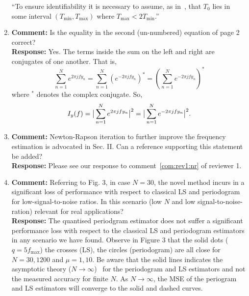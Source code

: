\documentclass[a4paper,10pt]{article}
\begin{document}
\begin{enumerate}
``To ensure identifiability it is necessary to assume, as in~\cite{Sidiropoulos2005}, that $T_0$ lies in some interval $(T_{\text{min}}, T_{\text{max}})$ where $T_{\text{max}} < 2T_{\text{min}}$.''

\item\textbf{Comment:}
Is the equality in the second (un-numbered) equation of page 2 correct?
\\
\textbf{Response:}
Yes.  The terms inside the sum on the left and right are conjugates of one another.  That is,
\[
\sum_{n=1}^N e^{ 2\pi j f y_n} = \sum_{n=1}^N (e^{-2\pi j f y_n})^* = \left( \sum_{n=1}^N e^{ -2\pi j f y_n} \right)^*
\]
where $^*$ denotes the complex conjugate.  So,
\[
I_y(f) = \big\vert  \sum_{n=1}^N e^{ 2\pi j f y_n}  \big\vert^2 = \big\vert  \sum_{n=1}^N e^{ -2\pi j f y_n}  \big\vert^2.
\]

\item\textbf{Comment:}
Newton-Rapson iteration to further improve the frequency estimation is advocated in Sec. II. Can a reference supporting this statement be added?
\\
\textbf{Response:}
Please see our response to comment~\ref{com:rev1:nr} of reviewer 1.

\item\textbf{Comment:}
Referring to Fig. 3, in case $N=30$, the novel method incurs in a significant loss of performance with respect to classical LS and periodogram for low-signal-to-noise ratios. In this scenario (low $N$ and low signal-to-noise-ration) relevant for real applications?
\\
\textbf{Response:}
The quantised periodgram estimator does not suffer a significant performance loss with respect to the classical LS and periodogram estimators in any scenario we have found.  Observe in Figure 3 that the solid dots ($q=5 f_{\text{max}}$) the crosses (LS), the circles (periodogram) are all close for $N=30,1200$ and $\mu=1,10$.  Be aware that the solid lines indicates the asymptotic theory ($N\to\infty$)~\cite{Quinn_sparse_noisy_SSP_2012,Quinn20013asilomar_period_est} for the periodogram and LS estimators and not the measured accuracy for finite $N$.  As $N\to\infty$, the MSE of the periogram and LS estimators will converge to the solid and dashed curves.

\end{enumerate}



{\small

}
\end{document}
